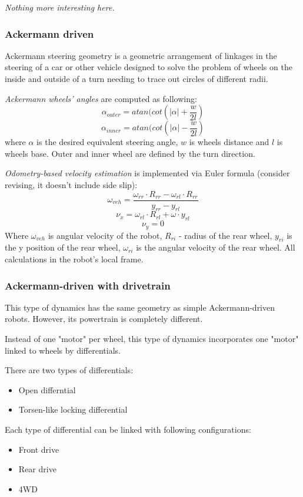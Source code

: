 \documentclass[a4paper,11pt]{article}
\begin{document}
\textit{Nothing more interesting here.}
\subsubsection{Ackermann driven}

Ackermann steering geometry is a geometric arrangement of linkages in the steering of a car or other vehicle designed to solve the problem of wheels on the inside and outside of a turn needing to trace out circles of different radii.

\textit{Ackermann wheels' angles }are computed as following:
\[
\alpha_{outer} = atan(cot(|\alpha| + \frac{w}{2l})
\]
\[
\alpha_{inner} = atan(cot(|\alpha| - \frac{w}{2l})
\]
where $\alpha$ is the desired equivalent steering angle, $w$ is wheels distance and $l$ is wheels base.
Outer and inner wheel are defined by the turn direction.



\textit{Odometry-based velocity estimation} is implemented via Euler formula (consider revising, it doesn't include side slip):
\[
\omega_{veh} = \frac{\omega_{rr} \cdot R_{rr} - \omega_{rl} \cdot R_{rr}}{y_{rr} - y_{rl}}
\]
\[
\nu_x = \omega_{rl} \cdot R_{rl} + \omega \cdot y_{rl}
\]
\[
\nu_y = 0
\]
Where $\omega_{veh}$ is angular velocity of the robot, $R_{ri}$ - radius of the rear wheel, $y_{ri}$ is the y position of the rear wheel, $\omega_{ri}$ is the angular velocity of the rear wheel. All calculations in the robot's local frame. 


\subsubsection{Ackermann-driven with drivetrain}

This type of dynamics has the same geometry as simple Ackermann-driven robots. However, its powertrain is completely different. 

Instead of one "motor" per wheel, this type of dynamics incorporates one "motor" linked to wheels by differentials. 

There are two types of differentials:
\begin{itemize}
	\item Open differntial
	\item Torsen-like locking differential \cite{torsen-whitepaper}
\end{itemize}

Each type of differential can be linked with following configurations: 
\begin{itemize}
	\item Front drive
	\item Rear drive
	\item 4WD
\end{itemize}
\end{document}
